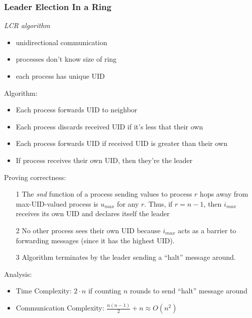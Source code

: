 \documentclass[a4paper,10pt,]{article}
\begin{document}
\subsubsection{Leader Election In a Ring}
\emph{LCR algorithm}
\begin{itemize}
  \item unidirectional communication
  \item processes don't know size of ring
  \item each process has unique UID
\end{itemize}
Algorithm:
\begin{itemize}
  \item Each process forwards UID to neighbor
  \item Each process discards received UID if it's less that their own
  \item Each process forwards UID if received UID is greater than their own
  \item If process receives their own UID, then they're the leader
\end{itemize}
Proving correctness:
\begin{itemize}
  \item[1] The \emph{snd} function of a process sending values to process $r$ hops away from max-UID-valued process is $u_{max}$ for any $r$.  Thus, if $r = n-1$, then $i_{max}$ receives its own UID and declares itself the leader
  \item[2] No other process sees their own UID because $i_{max}$ acts as a barrier to forwarding messages (since it has the highest UID).
  \item[3] Algorithm terminates by the leader sending a ``halt'' message around.
\end{itemize}
Analysis:
\begin{itemize}
  \item Time Complexity: $2\cdot n$ if counting $n$ rounds to send ``halt'' message around
  \item Communication Complexity: $\frac{n(n-1)}{2} + n \approx O(n^2)$
\end{itemize}
\end{document}
